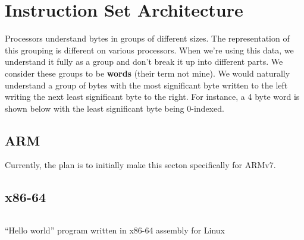 \chapter{Instruction Set Architecture}

Processors understand bytes in groups of different sizes. The representation of
this grouping is different on various processors. When we're using this data, we
understand it fully as a group and don't break it up into different parts. We
consider these groups to be \textbf{words} (their term not mine). We would
naturally understand a group of bytes with the most significant byte written to
the left writing the next least significant byte to the right. For instance, a 4
byte word is shown below with the least significant byte being 0-indexed.

\begin{center}
\end{center}

\section{ARM}

Currently, the plan is to initially make this secton specifically for ARMv7.

\section{x86-64}

\begin{listing}[H]
  \inputminted[frame=lines]{asm}{code/hello_world.asm}
  \caption{``Hello world'' program written in x86-64 assembly for Linux}
  \label{lst:hello-world-asm}
\end{listing}

